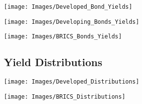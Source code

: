 \documentclass[11pt,preprint, authoryear]{elsarticle}
\let\origfigure\figure
\let\endorigfigure\endfigure
\renewenvironment{figure}[1][2] {
    \expandafter\origfigure\expandafter[H]
} {
    \endorigfigure
}
\numberwithin{equation}{section}
\numberwithin{figure}{section}
\numberwithin{table}{section}
\begin{document}
\begin{figure}

{\centering \texttt{[image: Images/Developed\_Bond\_Yields]} 

}

\caption{Bond Yields of Developed Nations \label{Figure1.1}}\label{fig:unnamed-chunk-2}
\end{figure}

\begin{figure}

{\centering \texttt{[image: Images/Developing\_Bonds\_Yields]} 

}

\caption{Bond Yields of Developing Nations \label{Figure1.2}}\label{fig:unnamed-chunk-3}
\end{figure}

\begin{figure}

{\centering \texttt{[image: Images/BRICS\_Bonds\_Yields]} 

}

\caption{Bond Yields of BRICS Nations \label{Figure1.3}}\label{fig:unnamed-chunk-4}
\end{figure}

\hypertarget{yield-distributions}{%
\subsection{Yield Distributions}\label{yield-distributions}}

\begin{figure}

{\centering \texttt{[image: Images/Developed\_Distributions]} 

}

\caption{Bond Yield Distributions of Developed Nations \label{Figure2.1}}\label{fig:unnamed-chunk-5}
\end{figure}

\begin{figure}

{\centering \texttt{[image: Images/BRICS\_Distributions]} 

}

\caption{Bond Yield Distributions of BRICS Nations \label{Figure2.2}}\label{fig:unnamed-chunk-6}
\end{figure}
\end{document}
